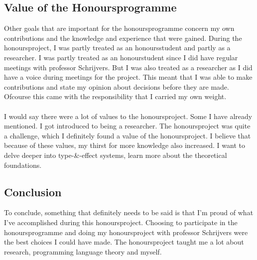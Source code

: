 \subsection{Value of the Honoursprogramme}
Other goals that are important for the honoursprogramme concern my own contributions and the knowledge and experience that were gained. During the honoursproject, I was partly treated as an honoursstudent and partly as a researcher. I was partly treated as an honourstudent since I did have regular meetings with professor Schrijvers. But I was also treated as a researcher as I did have a voice during meetings for the project. This meant that I was able to make contributions and state my opinion about decisions before they are made. Ofcourse this came with the responsibility that I carried my own weight.\\
\\
I would say there were a lot of values to the honoursproject. Some I have already mentioned. I got introduced to being a researcher. The honoursproject was quite a challenge, which I definitely found a value of the honoursproject.  I believe that because of these values, my thirst for more knowledge also increased. I want to delve deeper into type-\&-effect systems, learn more about the theoretical foundations. 

\subsection{Conclusion}
To conclude, something that definitely needs to be said is that I'm proud of what I've accomplished during this honoursproject. Choosing to participate in the honoursprogramme and doing my honoursproject with professor Schrijvers were the best choices I could have made. The honoursproject taught me a lot about research, programming language theory and myself. 
